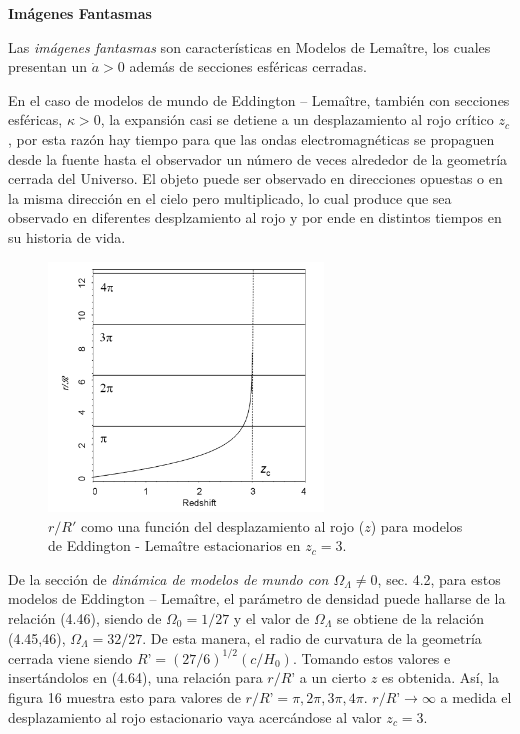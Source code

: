 \documentclass[11pt]{article}
\begin{document}
{\vspace{0.4cm}
    
    
{\bf{\large{Imágenes Fantasmas}}}

Las {\textit{imágenes fantasmas}} son características en Modelos de Lema\^itre, los cuales presentan un $\dot{a} > 0$ además de secciones esféricas cerradas.

En el caso de modelos de mundo de Eddington – Lema\^itre, también con secciones esféricas, $\kappa >0$, la expansión casi se detiene a un desplazamiento al rojo crítico $z_c$, por esta razón hay tiempo para que las ondas electromagnéticas se propaguen desde la fuente hasta el observador un número de veces alrededor de la geometría cerrada del Universo. El objeto puede ser observado en direcciones opuestas o en la misma dirección en el cielo pero multiplicado, lo cual produce que sea observado en diferentes desplzamiento al rojo y por ende en distintos tiempos en su historia de vida.
    
    \begin{figure}                  \includegraphics[width=0.65\textwidth]{710_Malcolmpp238.png}
        \caption{\footnotesize{$r/R'$ como una función del desplazamiento al rojo ($z$) para modelos de Eddington - Lema\^itre estacionarios en $z_c = 3$.}}
    \end{figure}

    De la sección de {\textit{dinámica de modelos de mundo con $\Omega_{\Lambda} \neq 0$}}, sec. 4.2, para estos modelos de  Eddington – Lema\^itre, el parámetro de densidad puede hallarse de la relación (4.46), siendo de $\Omega_0 = 1/27$ y el valor de $\Omega_{\Lambda}$ se obtiene de la relación (4.45,46), $\Omega_{\Lambda} = 32/27$. De esta manera, el radio de curvatura de la geometría cerrada viene siendo $R’ = (27/6)^{1/2} (c/H_0)$. Tomando estos valores e insertándolos en (4.64), una relación para $r/R’$ a un cierto $z$ es obtenida. Así, la figura 16 muestra esto para valores de $r/R’ = \pi, 2 \pi, 3 \pi, 4 \pi$. $r/R’ \rightarrow{\infty}$ a medida el desplazamiento al rojo estacionario vaya acercándose al valor $z_c=3$. 
    
}
\end{document}
